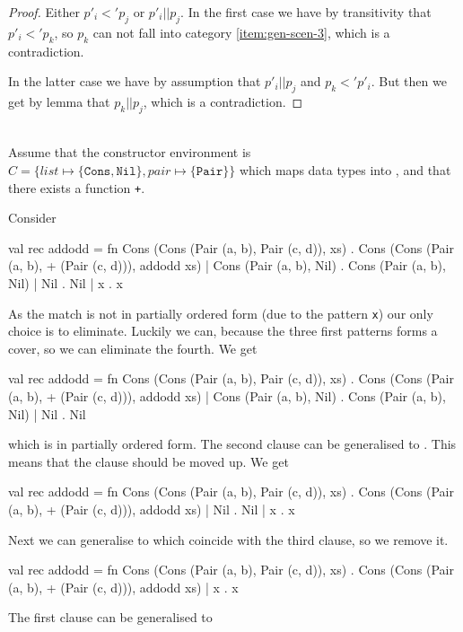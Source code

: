 \begin{definition}[Generalisation, $->g$]
\begin{proof}
    Either $p'_i <' p_j$ or $p'_i || p_j$. In the first case we have by
    transitivity that $p'_i <' p_k$, so $p_k$ can not fall into category
    \ref{item:gen-scen-3}, which is a contradiction.

    In the latter case we have by assumption that $p'_i || p_j$ and $p_k <'
    p'_i$. But then we get by lemma  that $p_k
    || p_j$, which is a contradiction.
  \end{proof}

\end{definition}

\begin{example}[Generalisation, $->g$]\ \\
Assume that the constructor environment is $C = \{list \mapsto \{\mathtt{Cons},
\mathtt{Nil} \}, pair \mapsto \{\mathtt{Pair}\} \}$ which maps data types into ,
and that there exists a function \texttt{+}. 

Consider

\begin{sml}
val rec addodd = 
fn Cons (Cons (Pair (a, b), Pair (c, d)), xs) .
     Cons (Cons (Pair (a, b), + (Pair (c, d))), addodd xs)
 | Cons (Pair (a, b), Nil) . Cons (Pair (a, b), Nil)
 | Nil . Nil
 | x . x
\end{sml}

As the match is not in partially ordered form (due to the pattern \texttt{x})
our only choice is to eliminate. Luckily we can, because the three first
patterns forms a cover, so we can eliminate the fourth. We get
\begin{sml}
val rec addodd = 
fn Cons (Cons (Pair (a, b), Pair (c, d)), xs) .
     Cons (Cons (Pair (a, b), + (Pair (c, d))), addodd xs)
 | Cons (Pair (a, b), Nil) . Cons (Pair (a, b), Nil)
 | Nil . Nil
\end{sml}
which is in partially ordered form. The second clause can be generalised to
. This means that the clause  should be moved
up. We get
\begin{sml}
val rec addodd = 
fn Cons (Cons (Pair (a, b), Pair (c, d)), xs) .
     Cons (Cons (Pair (a, b), + (Pair (c, d))), addodd xs)
 | Nil . Nil
 | x . x
\end{sml}
Next we can generalise  to  which coincide with
the third clause, so we remove it.
\begin{sml}
val rec addodd = 
fn Cons (Cons (Pair (a, b), Pair (c, d)), xs) .
     Cons (Cons (Pair (a, b), + (Pair (c, d))), addodd xs)
 | x . x
\end{sml}
The first clause can be generalised to


\end{example}
